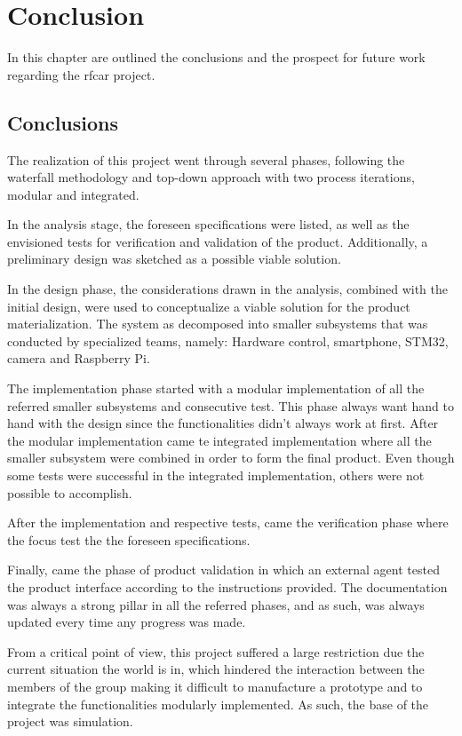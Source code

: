 \chapter{Conclusion}%
\label{ch:conclusion}
In this chapter are outlined the conclusions and the prospect for future work
regarding the \gls{rfcar} project.
%
\section{Conclusions}%
\label{ch:conclusion-concls}
The realization of this project went through several phases, following the
waterfall methodology and top-down approach with two process iterations, modular
and integrated.

In the analysis stage, the foreseen specifications were listed, as well as the
envisioned tests for verification and validation of the product. Additionally, a
preliminary design was sketched as a possible viable solution.

In the design phase, the considerations drawn in the analysis, combined with the
initial design, were used to conceptualize a viable solution for the product
materialization. The system as decomposed into smaller subsystems that was
conducted by specialized teams, namely: Hardware control, smartphone, STM32,
camera and Raspberry Pi.

The implementation phase started with a modular implementation of all the
referred smaller subsystems and consecutive test. This phase always want hand to
hand with the design since the functionalities didn't always work at
first. After the modular implementation came te integrated implementation where
all the smaller subsystem were combined in order to form the final product. Even
though some tests were successful in the integrated implementation, others were
not possible to accomplish.

After the implementation and respective tests, came the verification phase where
the focus test the the foreseen specifications.

Finally, came the phase of product validation in which an external agent tested the product interface according to the instructions provided.
The documentation was always a strong pillar in all the referred phases, and as
such, was always updated every time any progress was made.

From a critical point of view, this project suffered a large restriction due the
current situation the world is in, which hindered the interaction between the
members of the group making it difficult to manufacture a prototype and to
integrate the functionalities modularly implemented. As such, the base of the
project was simulation.

